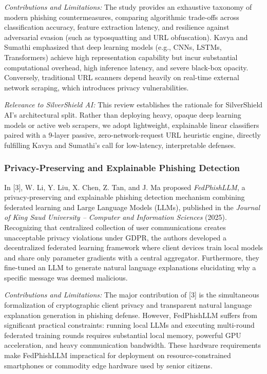 \documentclass[conference]{IEEEtran}
\begin{document}
\textit{Contributions and Limitations:} The study provides an exhaustive taxonomy of modern phishing countermeasures, comparing algorithmic trade-offs across classification accuracy, feature extraction latency, and resilience against adversarial evasion (such as typosquatting and URL obfuscation). Kavya and Sumathi emphasized that deep learning models (e.g., CNNs, LSTMs, Transformers) achieve high representation capability but incur substantial computational overhead, high inference latency, and severe black-box opacity. Conversely, traditional URL scanners depend heavily on real-time external network scraping, which introduces privacy vulnerabilities. 

\textit{Relevance to SilverShield AI:} This review establishes the rationale for SilverShield AI's architectural split. Rather than deploying heavy, opaque deep learning models or active web scrapers, we adopt lightweight, explainable linear classifiers paired with a 9-layer passive, zero-network-request URL heuristic engine, directly fulfilling Kavya and Sumathi's call for low-latency, interpretable defenses.

\subsubsection{Privacy-Preserving and Explainable Phishing Detection}
In [3], W. Li, Y. Liu, X. Chen, Z. Tan, and J. Ma proposed \textit{FedPhishLLM}, a privacy-preserving and explainable phishing detection mechanism combining federated learning and Large Language Models (LLMs), published in the \textit{Journal of King Saud University -- Computer and Information Sciences} (2025). Recognizing that centralized collection of user communications creates unacceptable privacy violations under GDPR, the authors developed a decentralized federated learning framework where client devices train local models and share only parameter gradients with a central aggregator. Furthermore, they fine-tuned an LLM to generate natural language explanations elucidating why a specific message was deemed malicious.

\textit{Contributions and Limitations:} The major contribution of [3] is the simultaneous formalization of cryptographic client privacy and transparent natural language explanation generation in phishing defense. However, FedPhishLLM suffers from significant practical constraints: running local LLMs and executing multi-round federated training rounds requires substantial local memory, powerful GPU acceleration, and heavy communication bandwidth. These hardware requirements make FedPhishLLM impractical for deployment on resource-constrained smartphones or commodity edge hardware used by senior citizens.
\end{document}

